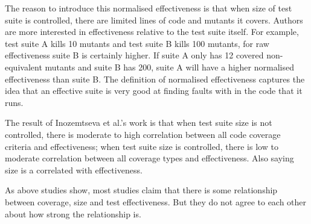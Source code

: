 The reason to introduce this normalised effectiveness is that when size of test suite is controlled, there are limited lines of code and mutants it covers. Authors are more interested in effectiveness relative to the test suite itself. For example, test suite A kills 10 mutants and test suite B kills 100 mutants, for raw effectiveness suite B is certainly higher. If suite A only has 12 covered non-equivalent mutants and suite B has 200, suite A will have a higher normalised effectiveness than suite B. The definition of normalised effectiveness captures the idea that an effective suite is very good at finding faults with in the code that it runs.

The result of Inozemtseva et al.'s work is that when test suite size is not controlled, there is moderate to high correlation between all code coverage criteria and effectiveness; when test suite size is controlled, there is low to moderate correlation between all coverage types and effectiveness. Also saying size is a correlated with effectiveness.

As above studies show, most studies claim that there is some relationship between coverage, size and test effectiveness. But they do not agree to each other about how strong the relationship is.
